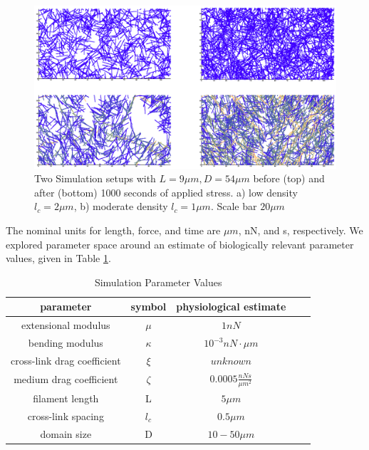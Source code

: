 \documentclass[pre,preprint]{revtex4-1}
\begin{document}
\begin{figure}[h!]
\centering
\includegraphics[width=\hsize]{network_def}
\caption{\label{fig:sim}Two Simulation setups with $L=9 \mu m, D = 54 \mu m$ before (top) and after  (bottom) 1000 seconds of applied stress. a) low density $l_c=2 \mu m$, b) moderate density $l_c=1 \mu m.  $ Scale bar $ 20 \mu m$}
\end{figure}

The nominal units for length, force, and time are $\mu m$, nN, and s, respectively.  We explored parameter space around an estimate of biologically relevant parameter values, given in Table \ref{table:para}. 

\begin{table}[h]
\centering
\caption{Simulation Parameter Values}
\label{table:para}
\begin{tabular}{|c|c|c|c|c|}
\hline
{\bf parameter}             & {\bf symbol} & {\bf physiological estimate}          \\ \hline
extensional modulus         & $\mu$        & $1 nN $                                               \\
bending modulus             & $\kappa$     & $ 10^{-3} nN \cdot \mu m$                           \\
cross-link drag coefficient & $\xi$      & $unknown $              \\
medium drag coefficient     & $\zeta$        & $0.0005 \frac{nN s}{\mu m^2} $      \\
filament length             & L            & $5 \mu m$                                          \\
cross-link spacing          & $l_c$        & $0.5 \mu m$                                         \\
domain size                 & D            & $10-50 \mu m$                                 \\ \hline
\end{tabular}
\end{table}
\end{document}
